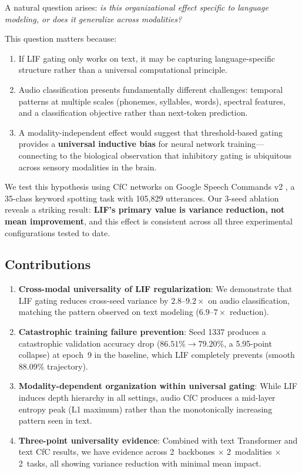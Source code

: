 \documentclass[11pt]{article}
\begin{document}
A natural question arises: \emph{is this organizational effect specific to language modeling, or does it generalize across modalities?}

This question matters because:
\begin{enumerate}
    \item If LIF gating only works on text, it may be capturing language-specific structure rather than a universal computational principle.
    \item Audio classification presents fundamentally different challenges: temporal patterns at multiple scales (phonemes, syllables, words), spectral features, and a classification objective rather than next-token prediction.
    \item A modality-independent effect would suggest that threshold-based gating provides a \textbf{universal inductive bias} for neural network training---connecting to the biological observation that inhibitory gating is ubiquitous across sensory modalities in the brain.
\end{enumerate}

We test this hypothesis using CfC networks \cite{hasani2022closed} on Google Speech Commands v2 \cite{warden2018speech}, a 35-class keyword spotting task with 105,829 utterances. Our 3-seed ablation reveals a striking result: \textbf{LIF's primary value is variance reduction, not mean improvement}, and this effect is consistent across all three experimental configurations tested to date.

\subsection{Contributions}

\begin{enumerate}
    \item \textbf{Cross-modal universality of LIF regularization}: We demonstrate that LIF gating reduces cross-seed variance by $2.8$--$9.2\times$ on audio classification, matching the pattern observed on text modeling ($6.9$--$7\times$ reduction).
    \item \textbf{Catastrophic training failure prevention}: Seed 1337 produces a catastrophic validation accuracy drop ($86.51\% \to 79.20\%$, a 5.95-point collapse) at epoch~9 in the baseline, which LIF completely prevents (smooth 88.09\% trajectory).
    \item \textbf{Modality-dependent organization within universal gating}: While LIF induces depth hierarchy in all settings, audio CfC produces a mid-layer entropy peak (L1 maximum) rather than the monotonically increasing pattern seen in text.
    \item \textbf{Three-point universality evidence}: Combined with text Transformer and text CfC results, we have evidence across 2~backbones $\times$ 2~modalities $\times$ 2~tasks, all showing variance reduction with minimal mean impact.
\end{enumerate}
\end{document}
